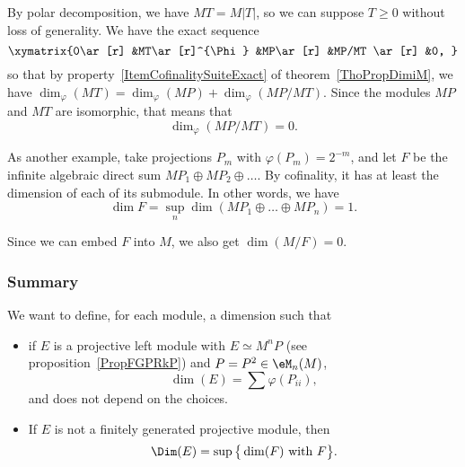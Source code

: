 By polar decomposition, we have $MT=M| T |$, so we can suppose $T\geq 0$ without loss of generality. We have the exact sequence
\[
	\xymatrix{%
   0\ar[r] 	&MT\ar[r]^{\Phi}	&MP\ar[r]	&MP/MT \ar[r]	&0,
}
\]
so that by property~\ref{ItemCofinalitySuiteExact} of theorem~\ref{ThoPropDimiM}, we have $\dim_{\varphi}(MT)=\dim_{\varphi}(MP)+\dim_{\varphi}(MP/MT)$. Since the modules $MP$ and $MT$ are isomorphic, that means that
\[
	\dim_{\varphi}(MP/MT)=0.
\]

As another example, take projections $P_m$ with $\varphi(P_m)=2^{-m}$, and let $F$ be the infinite algebraic direct sum $MP_1\oplus MP_2\oplus\ldots$. By cofinality, it has at least the dimension of each of its submodule. In other words, we have
\[
	\dim F=\sup_n\dim(MP_1\oplus\ldots\oplus MP_n)=1.
\]

Since we can embed $F$ into $M$, we also get $\dim(M/F)=0$.

					\subsubsection{Summary}

We want to define, for each module, a dimension such that
\begin{itemize}
\item if $E$ is a projective left module with $E\simeq M^nP$ (see proposition~\ref{PropFGPRkP}) and $P=P^2\in\eM_n(M)$,
\[
	\dim(E)=\sum \varphi(P_{ii}),
\]
and does not depend on the choices.
\item If $E$ is not a finitely generated projective module, then
\begin{equation}		\label{DefDimAvecGrandD}
	\Dim(E)=\sup\big\{  \dim(F)\text{ with }F \big\}.
\end{equation}
\end{itemize}

